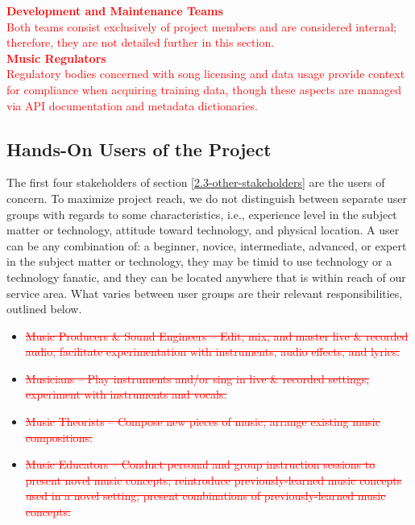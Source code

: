 \documentclass[12pt]{article}
\begin{document}
  \noindent\textcolor{red}{\textbf{Development and Maintenance Teams}}\\
\textcolor{red}{Both teams consist exclusively of project members and are considered internal; therefore, they are not detailed further in this section.}\\

\noindent\textcolor{red}{\textbf{Music Regulators}}\\
\textcolor{red}{Regulatory bodies concerned with song licensing and data usage provide context for compliance when acquiring training data, though 
  these aspects are managed via API documentation and metadata dictionaries.}\\



\subsection{Hands-On Users of the Project} \label{2.4-hands-on-users}
The first four stakeholders of section \ref{2.3-other-stakeholders} are the users of concern. To maximize project reach, we do not distinguish between separate user groups with regards to some characteristics, i.e., experience level in the subject matter or technology, attitude toward technology, and physical location. A user can be any combination of: a beginner, novice, intermediate, advanced, or expert in the subject matter or technology, they may be timid to use technology or a technology fanatic, and they can be located anywhere that is within reach of our service area. What varies between user groups are their relevant responsibilities, outlined below.
\begin{itemize}
  \item \textcolor{red}{\sout{Music Producers \& Sound Engineers -- Edit, mix, and master live \& recorded audio; facilitate experimentation with instruments, audio effects, and lyrics.}}  
  \item \textcolor{red}{\sout{Musicians -- Play instruments and/or sing in live \& recorded settings; experiment with instruments and vocals.}}
  \item \textcolor{red}{\sout{Music Theorists -- Compose new pieces of music; arrange existing music compositions.}}  
  \item \textcolor{red}{\sout{Music Educators -- Conduct personal and group instruction sessions to present novel music concepts; reintroduce previously-learned music concepts used in a novel setting; present combinations of previously-learned music concepts.}}
\end{itemize}
\end{document}
